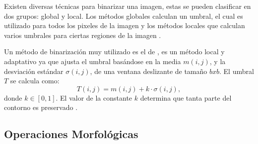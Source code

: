 Existen diversas técnicas para binarizar una imagen, estas se pueden clasificar en dos grupos: global y local. Los métodos globales calculan un umbral, el cual es utilizado para todos los pixeles de la imagen y los métodos locales que calculan varios umbrales para ciertas regiones de la imagen \citep{Chaki2014}.  

Un método de binarización muy utilizado es el de \citep{Niblack1985}, es un método local y adaptativo ya que ajusta el umbral basándose en la media $m(i,j)$, y la desviación estándar $\sigma(i,j)$, de una ventana deslizante de tamaño $bxb$. El umbral $T$ se calcula como: 
$$T(i,j)=m(i,j)+k \cdot \sigma(i,j),$$ 
donde $k \in [0,1]$. El valor de la constante $k$ determina que tanta parte del contorno es preservado \citep{Chaki2014}.


  
\subsection{Operaciones Morfológicas}\label{subsec:OperacionesMorfologicas} 

